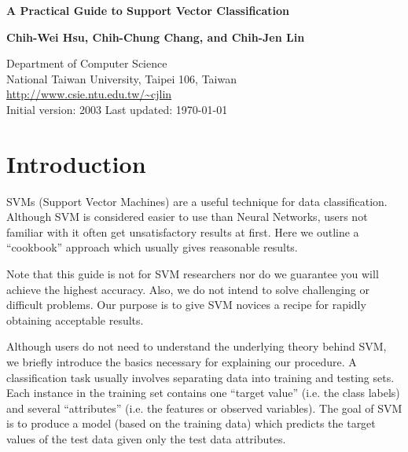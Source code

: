\documentclass[12pt]{article}
\begin{document}
\setlength{\baselineskip}{18pt}
\begin{center}
{\Large\bf A Practical Guide to Support Vector Classification}

\bigskip

{\bf Chih-Wei Hsu, Chih-Chung Chang, and
 Chih-Jen Lin}\\
\medskip

Department of Computer Science\\
National Taiwan University, Taipei 106, Taiwan \\
\url{http://www.csie.ntu.edu.tw/~cjlin}\\
Initial version: 2003 \quad Last updated: \today
\end{center}
\smallskip


\begin{abstract}
The support vector machine (SVM) is a popular classification
technique. However, beginners who are not familiar with SVM often
get unsatisfactory results since they miss some easy but significant
steps. In this guide, we propose a simple procedure which usually
gives reasonable results.
\end{abstract}


\section{Introduction}
\label{intro}
SVMs (Support Vector Machines) are a useful technique for data
classification. Although SVM is considered easier to use than Neural
Networks, users not familiar with it often get unsatisfactory results
at first.  Here we outline a ``cookbook'' approach which usually gives
reasonable results.

Note that this guide is not for SVM researchers nor do we guarantee
you will achieve the highest accuracy. Also, we do not intend to solve
challenging or difficult problems. Our purpose is to give SVM novices
a recipe for rapidly obtaining acceptable results. 

Although users do not need to understand the underlying theory behind
SVM, we briefly introduce the basics necessary for explaining our
procedure. A classification task usually involves separating data into
training and testing sets. Each instance in the training set contains
one ``target value'' (i.e. the class labels) and several
``attributes'' (i.e. the features or observed variables). The goal of
SVM is to produce a model (based on the training data) which predicts
the target values of the test data given only the test data
attributes. 
\end{document}

